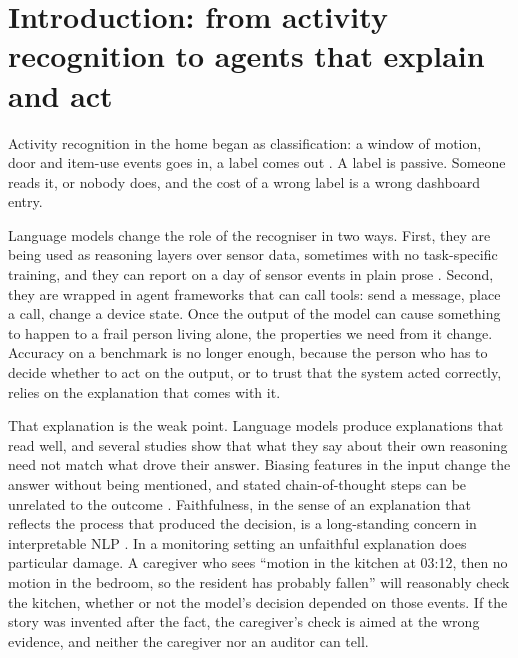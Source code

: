 \documentclass[11pt,a4paper]{article}
\begin{document}
\section{Introduction: from activity recognition to agents that explain and act}

Activity recognition in the home began as classification: a window of motion, door and item-use events goes in, a label comes out \cite{cook2013casas}. A label is passive. Someone reads it, or nobody does, and the cost of a wrong label is a wrong dashboard entry.

Language models change the role of the recogniser in two ways. First, they are being used as reasoning layers over sensor data, sometimes with no task-specific training, and they can report on a day of sensor events in plain prose \cite{ji2024hargpt,civitarese2024zeroshot}. Second, they are wrapped in agent frameworks that can call tools: send a message, place a call, change a device state. Once the output of the model can cause something to happen to a frail person living alone, the properties we need from it change. Accuracy on a benchmark is no longer enough, because the person who has to decide whether to act on the output, or to trust that the system acted correctly, relies on the explanation that comes with it.

That explanation is the weak point. Language models produce explanations that read well, and several studies show that what they say about their own reasoning need not match what drove their answer. Biasing features in the input change the answer without being mentioned, and stated chain-of-thought steps can be unrelated to the outcome \cite{turpin2023say,lanham2023faithfulness}. Faithfulness, in the sense of an explanation that reflects the process that produced the decision, is a long-standing concern in interpretable NLP \cite{jain2019attention,jacovi2020faithfully}. In a monitoring setting an unfaithful explanation does particular damage. A caregiver who sees ``motion in the kitchen at 03:12, then no motion in the bedroom, so the resident has probably fallen'' will reasonably check the kitchen, whether or not the model's decision depended on those events. If the story was invented after the fact, the caregiver's check is aimed at the wrong evidence, and neither the caregiver nor an auditor can tell.
\end{document}
